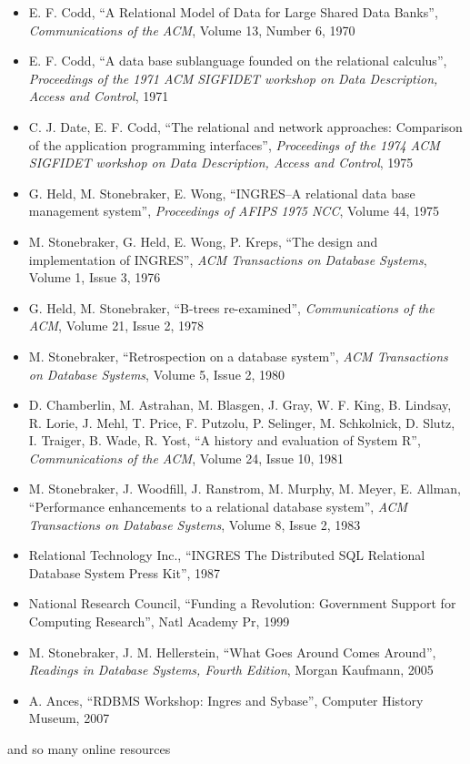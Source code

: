\begin{itemize}
 \item E. F. Codd, ``A Relational Model of Data for Large Shared Data
       Banks'', {\it Communications of the ACM}, Volume 13, Number 6,
       1970
 \item E. F. Codd, ``A data base sublanguage founded on the relational
       calculus'', {\it Proceedings of the 1971 ACM SIGFIDET workshop
       on Data Description, Access and Control}, 1971
 \item C. J. Date, E. F. Codd, ``The relational and network approaches: Comparison of the
       application programming interfaces'', {\it Proceedings of the
       1974 ACM SIGFIDET workshop on Data Description, Access and
       Control}, 1975
 \item G. Held, M. Stonebraker, E. Wong, ``INGRES--A relational data
       base management system'', {\it Proceedings of AFIPS 1975 NCC},
       Volume 44, 1975
 \item M. Stonebraker, G. Held, E. Wong, P. Kreps, ``The design and
       implementation of INGRES'', {\it ACM Transactions on Database
       Systems}, Volume 1, Issue 3, 1976
 \item G. Held, M. Stonebraker, ``B-trees re-examined'', {\it Communications of the
       ACM}, Volume 21, Issue 2, 1978
 \item M. Stonebraker, ``Retrospection on a database system'', {\it ACM
       Transactions on Database Systems}, Volume 5, Issue 2, 1980
 \item D. Chamberlin, M. Astrahan, M. Blasgen, J. Gray, W. F. King,
       B. Lindsay, R. Lorie, J. Mehl, T. Price, F. Putzolu, P. Selinger,
       M. Schkolnick, D. Slutz, I. Traiger, B. Wade, R. Yost, ``A
       history and evaluation of System R'', {\it Communications of the
       ACM}, Volume 24, Issue 10, 1981
 \item M. Stonebraker, J. Woodfill, J. Ranstrom, M. Murphy, M. Meyer,
       E. Allman, ``Performance enhancements to a relational database
       system'', {\it ACM Transactions on Database Systems}, Volume 8,
       Issue 2, 1983
 \item Relational Technology Inc., ``INGRES The Distributed SQL
       Relational Database System Press Kit'', 1987
 \item National Research Council, ``Funding a Revolution: Government
       Support for Computing Research'', Natl Academy Pr, 1999
 \item M. Stonebraker, J. M. Hellerstein, ``What Goes Around Comes
       Around'', {\it Readings in Database Systems, Fourth Edition},
       Morgan Kaufmann, 2005
 \item A. Ances, ``RDBMS Workshop: Ingres and Sybase'', Computer
       History Museum, 2007
\end{itemize}

and so many online resources

\normalsize